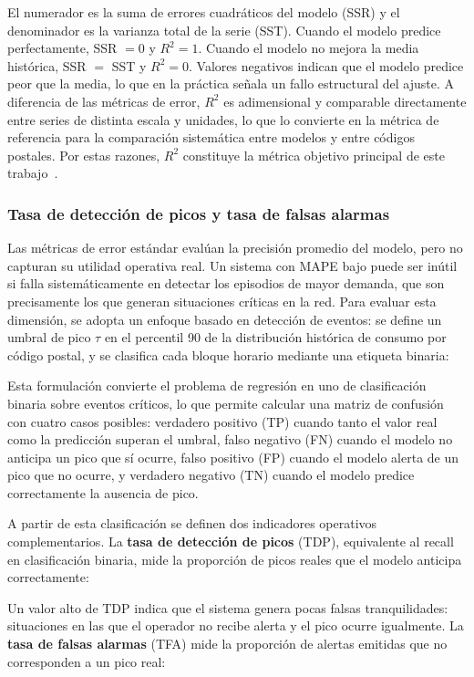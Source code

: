 \documentclass[12pt, a4paper]{article}
\begin{document}
El numerador es la suma de errores cuadráticos del modelo (SSR) y el denominador es la varianza total de la serie (SST). Cuando el modelo predice perfectamente, SSR $= 0$ y $R^2 = 1$. Cuando el modelo no mejora la media histórica, SSR $=$ SST y $R^2 = 0$. Valores negativos indican que el modelo predice peor que la media, lo que en la práctica señala un fallo estructural del ajuste. A diferencia de las métricas de error, $R^2$ es adimensional y comparable directamente entre series de distinta escala y unidades, lo que lo convierte en la métrica de referencia para la comparación sistemática entre modelos y entre códigos postales. Por estas razones, $R^2$ constituye la métrica objetivo principal de este trabajo~\cite{gassar2024, rubattu2023}.

\subsubsection{Tasa de detección de picos y tasa de falsas alarmas}


Las métricas de error estándar evalúan la precisión promedio del modelo, pero no capturan su utilidad operativa real. Un sistema con MAPE bajo puede ser inútil si falla sistemáticamente en detectar los episodios de mayor demanda, que son precisamente los que generan situaciones críticas en la red. Para evaluar esta dimensión, se adopta un enfoque basado en detección de eventos: se define un umbral de pico $\tau$ en el percentil 90 de la distribución histórica de consumo por código postal, y se clasifica cada bloque horario mediante una etiqueta binaria:

Esta formulación convierte el problema de regresión en uno de clasificación binaria sobre eventos críticos, lo que permite calcular una matriz de confusión con cuatro casos posibles: verdadero positivo (TP) cuando tanto el valor real como la predicción superan el umbral, falso negativo (FN) cuando el modelo no anticipa un pico que sí ocurre, falso positivo (FP) cuando el modelo alerta de un pico que no ocurre, y verdadero negativo (TN) cuando el modelo predice correctamente la ausencia de pico.

A partir de esta clasificación se definen dos indicadores operativos complementarios. La \textbf{tasa de detección de picos} (TDP), equivalente al recall en clasificación binaria, mide la proporción de picos reales que el modelo anticipa correctamente:

Un valor alto de TDP indica que el sistema genera pocas falsas tranquilidades: situaciones en las que el operador no recibe alerta y el pico ocurre igualmente. La \textbf{tasa de falsas alarmas} (TFA) mide la proporción de alertas emitidas que no corresponden a un pico real:
\end{document}
